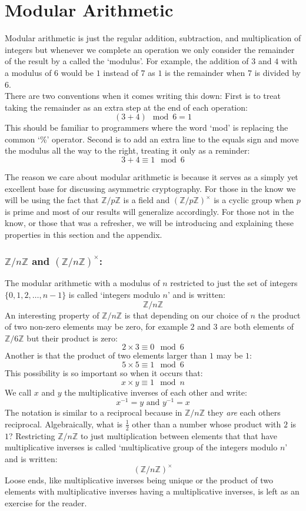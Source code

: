 
\section{Modular Arithmetic}
Modular arithmetic is just the regular addition, subtraction, and multiplication of integers but whenever we complete an operation we only consider the remainder of the result by a called the `modulus'.
For example,
the addition of $3$ and $4$ with a modulus of $6$ would be $1$ instead of $7$ as $1$ is the remainder when $7$ is divided by $6$.
\\

There are two conventions when it comes writing this down:
First is to treat taking the remainder as an extra step at the end of each operation:  
\[(3+4)\mod 6 = 1\]
This should be familiar to programmers where the word `mod' is replacing the common `\%' operator.
Second is to add an extra line to the equals sign and move the modulus all the way to the right, 
treating it only as a reminder:
\[3+4\equiv 1 \mod 6\]

The reason we care about modular arithmetic is because it serves as a simply yet excellent base for discussing asymmetric cryptography.
For those in the know we will be using the fact that $\mathbb{Z}/p\mathbb{Z}$ is a field and $(\mathbb{Z}/p\mathbb{Z})^\times$ is a cyclic group when $p$ is prime and most of our results will generalize accordingly.
For those not in the know,
or those that was a refresher,
we will be introducing and explaining these properties in this section and the appendix.

\subsubsection{$\mathbb{Z}/n\mathbb{Z}$ and $(\mathbb{Z}/n\mathbb{Z})^\times$:}
The modular arithmetic with a modulus of $n$ restricted to just the set of integers $\{0,1,2,\dots,n-1\}$ is called `integers modulo $n$' and is written:
\[\mathbb{Z}/n\mathbb{Z}\]
An interesting property of $\mathbb{Z}/n\mathbb{Z}$ is that depending on our choice of $n$ the product of two non-zero elements may be zero,
for example $2$ and $3$ are both elements of $\mathbb{Z}/6\mathbb{Z}$ but their product is zero:
\[ 2\times 3 \equiv 0 \mod 6\]
Another is that the product of two elements larger than $1$ may be $1$:
\[ 5\times 5 \equiv 1 \mod 6\]
This possibility is so important so when it occurs that:
\[x\times y\equiv 1 \mod n\]
We call $x$ and $y$ the multiplicative inverses of each other and write:
\[x^{-1} = y \text{  and  } y^{-1}=x\]
The notation is similar to a reciprocal because in $\mathbb{Z}/n\mathbb{Z}$ they \textit{are} each others reciprocal.
Algebraically, 
what is $\frac{1}{2}$ other than a number whose product with $2$ is $1$?
Restricting $\mathbb{Z}/n\mathbb{Z}$ to just multiplication between elements that that have multiplicative inverses is called `multiplicative group of the integers modulo $n$' and is written:
\[(\mathbb{Z}/n\mathbb{Z})^\times\]
Loose ends, 
like multiplicative inverses being unique or the product of two elements with multiplicative inverses having a multiplicative inverses,
is left as an exercise for the reader.


